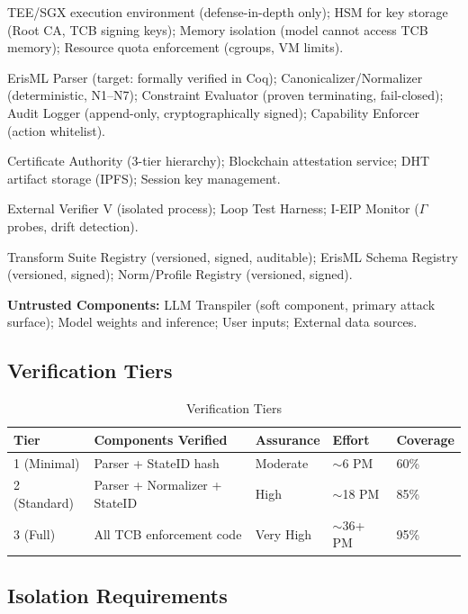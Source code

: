 \documentclass[11pt,letterpaper]{article}
\theoremstyle{definition}
\theoremstyle{remark}
\begin{document}
\begin{description}[style=nextline]
\item[Hardware Layer] TEE/SGX execution environment (defense-in-depth only); HSM for key storage (Root CA, TCB signing keys); Memory isolation (model cannot access TCB memory); Resource quota enforcement (cgroups, VM limits).
\item[Enforcement Layer] ErisML Parser (target: formally verified in Coq); Canonicalizer/Normalizer (deterministic, N1--N7); Constraint Evaluator (proven terminating, fail-closed); Audit Logger (append-only, cryptographically signed); Capability Enforcer (action whitelist).
\item[Cryptographic Layer] Certificate Authority (3-tier hierarchy); Blockchain attestation service; DHT artifact storage (IPFS); Session key management.
\item[Verification Layer] External Verifier V (isolated process); Loop Test Harness; I-EIP Monitor ($\Gamma$ probes, drift detection).
\item[Governance Layer] Transform Suite Registry (versioned, signed, auditable); ErisML Schema Registry (versioned, signed); Norm/Profile Registry (versioned, signed).
\end{description}

\noindent\textbf{Untrusted Components:} LLM Transpiler (soft component, primary attack surface); Model weights and inference; User inputs; External data sources.

\subsection{Verification Tiers}

\begin{table}[h]
\centering
\begin{tabular}{@{}lllll@{}}
\toprule
\textbf{Tier} & \textbf{Components Verified} & \textbf{Assurance} & \textbf{Effort} & \textbf{Coverage} \\
\midrule
1 (Minimal) & Parser + StateID hash & Moderate & $\sim$6 PM & 60\% \\
2 (Standard) & Parser + Normalizer + StateID & High & $\sim$18 PM & 85\% \\
3 (Full) & All TCB enforcement code & Very High & $\sim$36+ PM & 95\% \\
\bottomrule
\end{tabular}
\caption{Verification Tiers}
\end{table}

\subsection{Isolation Requirements}
\end{document}

